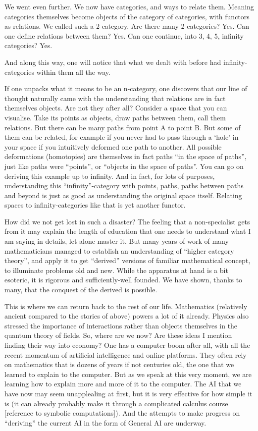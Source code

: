\documentclass{article}
\begin{document}
We went even further. We now have categories, and ways to relate them. Meaning categories themselves become objects of the category of categories, with functors as relations. We called such a 2-category. Are there many 2-categories? Yes. Can one define relations between them? Yes. Can one continue, into 3, 4, 5, infinity categories? Yes.

And along this way, one will notice that what we dealt with before had infinity-categories within them all the way.

If one unpacks what it means to be an n-category, one discovers that our line of thought naturally came with the understanding that relations are in fact themselves objects. Are not they after all? Consider a space that you can visualise. Take its points as objects, draw paths between them, call them relations. But there can be many paths from point A to point B. But some of them can be related, for example if you never had to pass through a ‘hole’ in your space if you intuitively deformed one path to another. All possible deformations (homotopies) are themselves in fact paths “in the space of paths”, just like paths were “points”, or “objects in the space of paths”. You can go on deriving this example up to infinity. And in fact, for lots of purposes, understanding this “infinity”-category with points, paths, paths between paths and beyond is just as good as understanding the original space itself. Relating spaces to infinity-categories like that is yet another functor.

How did we not get lost in such a disaster? The feeling that a non-specialist gets from it may explain the length of education that one needs to understand what I am saying in details, let alone master it. But many years of work of many mathematicians managed to establish an understanding of “higher category theory”, and apply it to get “derived” versions of familiar mathematical concept, to illuminate problems old and new. While the apparatus at hand is a bit esoteric, it is rigorous and sufficiently-well founded. We have shown, thanks to many, that the conquest of the derived is possible.

This is where we can return back to the rest of our life. Mathematics (relatively ancient compared to the stories of above) powers a lot of it already. Physics also stressed the importance of interactions rather than objects themselves in the quantum theory of fields. So, where are we now? Are these ideas I mention finding their way into economy? One has a computer boom after all, with all the recent momentum of artificial intelligence and online platforms. They often rely on mathematics that is dozens of years if not centuries old, the one that we learned to explain to the computer. But as we speak at this very moment, we are learning how to explain more and more of it to the computer. The AI that we have now may seem unapplealing at first, but it is very effective for how simple it is (it can already probably make it through a complicated calculus course [reference to symbolic computations]). And the attempts to make progress on “deriving” the current AI in the form of General AI are underway.
\end{document}
